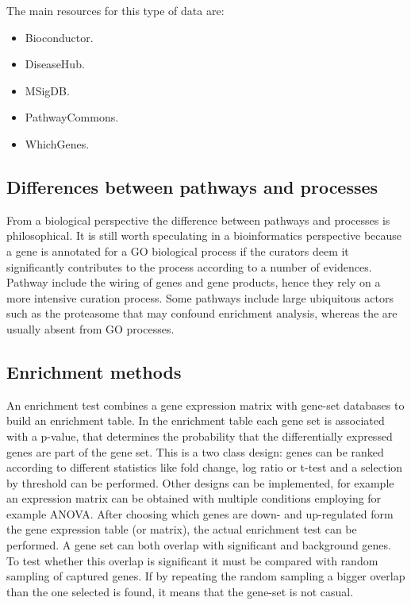		The main resources for this type of data are:

		\begin{multicols}{3}
			\begin{itemize}
				\item Bioconductor.
				\item DiseaseHub.
				\item MSigDB.
				\item PathwayCommons.
				\item WhichGenes.
			\end{itemize}
		\end{multicols}


	\subsection{Differences between pathways and processes}
	From a biological perspective the difference between pathways and processes is philosophical.
	It is still worth speculating in a bioinformatics perspective because a gene is annotated for a GO biological process if the curators deem it significantly contributes to the process according to a number of evidences.
	Pathway include the wiring of genes and gene products, hence they rely on a more intensive curation process.
	Some pathways include large ubiquitous actors such as the proteasome that may confound enrichment analysis, whereas the are usually absent from GO processes.


	\subsection{Enrichment methods}
	An enrichment test combines a gene expression matrix with gene-set databases to build an enrichment table.
	In the enrichment table each gene set is associated with a p-value, that determines the probability that the differentially expressed genes are part of the gene set.
	This is a two class design: genes can be ranked according to different statistics like fold change, log ratio or t-test and a selection by threshold can be performed.
	Other designs can be implemented, for example an expression matrix can be obtained with multiple conditions employing for example ANOVA.
	After choosing which genes are down- and up-regulated form the gene expression table (or matrix), the actual enrichment test can be performed.
	A gene set can both overlap with significant and background genes.
	To test whether this overlap is significant it must be compared with random sampling of captured genes.
	If by repeating the random sampling a bigger overlap than the one selected is found, it means that the gene-set is not casual.

